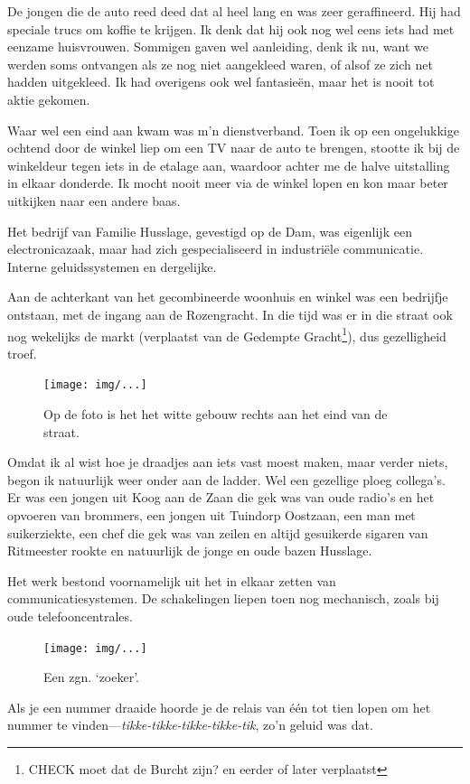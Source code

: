 \documentclass[12pt,twoside]{memoir}
\begin{document}
De jongen die de auto reed deed dat al heel lang en was zeer geraffineerd. Hij had speciale trucs om koffie te krijgen. Ik denk dat hij ook nog wel eens iets had met eenzame huisvrouwen. Sommigen gaven wel aanleiding, denk ik nu, want we werden soms ontvangen als ze nog niet aangekleed waren, of alsof ze zich net hadden uitgekleed. Ik had overigens ook wel fantasieën, maar het is nooit tot aktie gekomen. 

Waar wel een eind aan kwam was m’n dienstverband. Toen ik op een ongelukkige ochtend door de winkel liep om een TV naar de auto te brengen, stootte ik bij de winkeldeur tegen iets in de etalage aan, waardoor achter me de halve uitstalling in elkaar donderde. Ik mocht nooit meer via de winkel lopen en kon maar beter uitkijken naar een andere baas.

Het bedrijf van Familie Husslage, gevestigd op de Dam, was eigenlijk een electronicazaak, maar had zich gespecialiseerd in industriële communicatie. Interne geluidssystemen en dergelijke. 

Aan de achterkant van het gecombineerde woonhuis en winkel was een bedrijfje ontstaan, met de ingang aan de Rozengracht. In die tijd was er in die straat ook nog wekelijks de markt (verplaatst van de Gedempte Gracht\footnote{CHECK moet dat de Burcht zijn? en eerder of later verplaatst}), dus gezelligheid troef. 

\begin{figure}[t]
\texttt{[image: img/...]}
\caption{ Op de foto is het het witte gebouw rechts aan het eind van de straat.}
\end{figure}

Omdat ik al wist hoe je draadjes aan iets vast moest maken, maar verder niets, begon ik natuurlijk weer onder aan de ladder. Wel een gezellige ploeg collega’s. Er was een jongen uit Koog aan de Zaan die gek was van oude radio’s en het opvoeren van brommers, een jongen uit Tuindorp Oostzaan, een man met suikerziekte, een chef die gek was van zeilen en altijd gesuikerde sigaren van Ritmeester rookte en natuurlijk de jonge en oude bazen Husslage. 

Het werk bestond voornamelijk uit het in elkaar zetten van communicatiesystemen. De schakelingen liepen toen nog mechanisch, zoals bij oude telefooncentrales. 

\begin{figure}[t]
\texttt{[image: img/...]}
\caption{Een zgn. ‘zoeker’.}
\end{figure}

Als je een nummer draaide hoorde je de relais van één tot tien lopen om het nummer te vinden---\emph{tikke-tikke-tikke-tikke-tik}, zo’n geluid was dat. 
\end{document}
